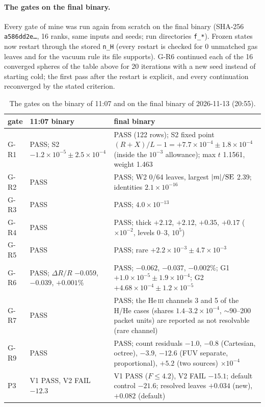 \documentclass[english,a4paper]{my_memo}
\newcommand{\code}[1]{\texttt{#1}}
\begin{document}
\paragraph{The gates on the final binary.}  Every gate of mine was run again
from scratch on the final binary (SHA-256 \code{a586dd2e\ldots}, 16 ranks,
same inputs and seeds; run directories \code{f\_*}).  Frozen states now
restart through the stored \code{n\_H} (every restart is checked for 0
unmatched gas leaves and for the vacuum rule its file supports).  G-R6
continued each of the 16 converged spheres of the table above for 20
iterations with a new seed instead of starting cold; the first pass after
the restart is explicit, and every continuation reconverged by the stated
criterion.
\begin{table}[ht]
\centering\small
\begin{tabular}{@{}lp{4.6cm}p{7.6cm}@{}}
\toprule
gate & 11:07 binary & final binary \\
\midrule
G-R1 & PASS; S2 $-1.2\times10^{-5}\pm2.5\times10^{-4}$ & PASS (122 rows); S2 fixed point $(R+X)/L-1=+7.7\times10^{-4}\pm1.8\times10^{-4}$ (inside the $10^{-3}$ allowance); max $t$ 1.1561, weight 1.463 \\
G-R2 & PASS & PASS; W2 0/64 leaves, largest $|m|/{\rm SE}$ 2.39; identities $2.1\times10^{-16}$ \\
G-R3 & PASS & PASS; $4.0\times10^{-13}$ \\
G-R4 & PASS & PASS; thick $+2.12$, $+2.12$, $+0.35$, $+0.17$ ($\times10^{-2}$, levels 0--3, $10^5$) \\
G-R5 & PASS & PASS; rare $+2.2\times10^{-3}\pm4.7\times10^{-3}$ \\
G-R6 & PASS; $\Delta R/R$ $-0.059$, $-0.039$, $+0.001\%$ & PASS; $-0.062$, $-0.037$, $-0.002\%$; G1 $+1.0\times10^{-5}\pm1.9\times10^{-4}$; G2 $+4.68\times10^{-4}\pm1.2\times10^{-5}$ \\
G-R7 & PASS & PASS; the He\,\textsc{iii} channels 3 and 5 of the H/He cases (shares $1.4$--$3.2\times10^{-4}$, $\sim\!90$--200 packet units) are reported as not resolvable (rare channel) \\
G-R9 & PASS & PASS; count residuals $-1.0$, $-0.8$ (Cartesian, octree), $-3.9$, $-12.6$ (FUV separate, proportional), $+5.2$ (two sources) $\times10^{-4}$ \\
P3 & V1 PASS, V2 FAIL $-12.3$ & V1 PASS ($F\le4.2$), V2 FAIL $-15.1$; default control $-21.6$; resolved leaves $+0.034$ (new), $+0.082$ (default) \\
\bottomrule
\end{tabular}
\caption{The gates on the binary of 11:07 and on the final binary of
2026-11-13 (20:55).}
\label{tab:reem-final}
\end{table}
\end{document}

